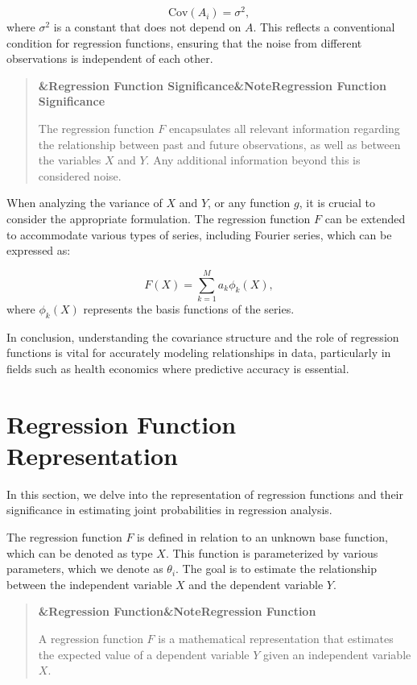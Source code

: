 \documentclass[a4paper]{article}
\newcommand{\boxheading}[1]{%
  \par\smallskip
  \noindent\textbf{\ifx&#1&Note\else#1\fi}\par
  \smallskip
}
\newenvironment{defbox}[1][]{%
  \begin{quote}\color{green!40!black}\boxheading{#1}\normalcolor
}{\end{quote}}
\newenvironment{rembox}[1][]{%
  \begin{quote}\color{black!70}\boxheading{#1}\normalcolor
}{\end{quote}}
\begin{document}
\begin{equation}
\text{Cov}(A_i) = \sigma^2,
\end{equation}
where \( \sigma^2 \) is a constant that does not depend on \( A \). This reflects a conventional condition for regression functions, ensuring that the noise from different observations is independent of each other.

\begin{rembox}[Regression Function Significance]
The regression function \( F \) encapsulates all relevant information regarding the relationship between past and future observations, as well as between the variables \( X \) and \( Y \). Any additional information beyond this is considered noise.
\end{rembox}

When analyzing the variance of \( X \) and \( Y \), or any function \( g \), it is crucial to consider the appropriate formulation. The regression function \( F \) can be extended to accommodate various types of series, including Fourier series, which can be expressed as:

\begin{equation}
F(X) = \sum_{k=1}^{M} a_k \phi_k(X),
\end{equation}
where \( \phi_k(X) \) represents the basis functions of the series.

In conclusion, understanding the covariance structure and the role of regression functions is vital for accurately modeling relationships in data, particularly in fields such as health economics where predictive accuracy is essential.

\section{Regression Function Representation}
In this section, we delve into the representation of regression functions and their significance in estimating joint probabilities in regression analysis.

The regression function \( F \) is defined in relation to an unknown base function, which can be denoted as type \( X \). This function is parameterized by various parameters, which we denote as \( \theta_i \). The goal is to estimate the relationship between the independent variable \( X \) and the dependent variable \( Y \).

\begin{defbox}[Regression Function]
A regression function \( F \) is a mathematical representation that estimates the expected value of a dependent variable \( Y \) given an independent variable \( X \).
\end{defbox}
\end{document}
